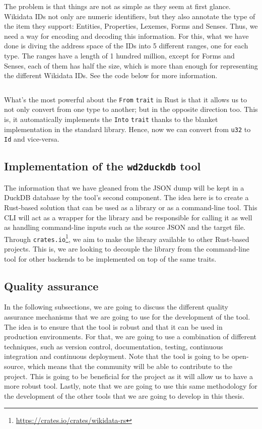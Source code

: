 The problem is that things are not as simple as they seem at first glance. Wikidata IDs not only are numeric identifiers, but they also annotate the type of the item they support: Entities, Properties, Lexemes, Forms and Senses. Thus, we need a way for encoding and decoding this information. For this, what we have done is diving the address space of the IDs into 5 different ranges, one for each type. The ranges have a length of 1 hundred million, except for Forms and Senses, each of them has half the size, which is more than enough for representing the different Wikidata IDs. See the code below for more information.

\begin{code}
    \inputminted{rust}{code/listings/10-1_ids.rs}
\end{code}

What's the most powerful about the \texttt{From} \texttt{trait} in Rust is that it allows us to not only convert from one type to another; but in the opposite direction too. This is, it automatically implements the \texttt{Into} \texttt{trait} thanks to the blanket implementation in the standard library. Hence, now we can convert from \texttt{u32} to \texttt{Id} and vice-versa.

\subsection{Implementation of the \texttt{wd2duckdb} tool}

The information that we have gleaned from the JSON dump will be kept in a DuckDB database by the tool's second component. The idea here is to create a Rust-based solution that can be used as a library or as a command-line tool. This CLI will act as a wrapper for the library and be responsible for calling it as well as handling command-line inputs such as the source JSON and the target file. Through \texttt{crates.io}\footnote{\url{https://crates.io/crates/wikidata-rs}}, we aim to make the library available to other Rust-based projects. This is, we are looking to decouple the library from the command-line tool for other backends to be implemented on top of the same traits.

\subsection{Quality assurance}

In the following subsections, we are going to discuss the different quality assurance mechanisms that we are going to use for the development of the tool. The idea is to ensure that the tool is robust and that it can be used in production environments. For that, we are going to use a combination of different techniques, such as version control, documentation, testing, continuous integration and continuous deployment. Note that the tool is going to be open-source, which means that the community will be able to contribute to the project. This is going to be beneficial for the project as it will allow us to have a more robust tool. Lastly, note that we are going to use this same methodology for the development of the other tools that we are going to develop in this thesis.

